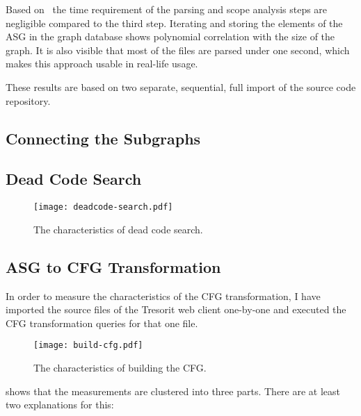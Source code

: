 Based on~ the time requirement of the parsing and scope analysis steps are negligible compared to the third step. Iterating and storing the elements of the ASG in the graph database shows polynomial correlation with the size of the graph. It is also visible that most of the files are parsed under one second, which makes this approach usable in real-life usage.

These results are based on two separate, sequential, full import of the source code repository.

\subsection{Connecting the Subgraphs}

\subsection{Dead Code Search}

\begin{figure}[!htb]
  \centering
  \texttt{[image: deadcode-search.pdf]}
  \caption{The characteristics of dead code search.}
  \label{fig:deadcode-search}
\end{figure}

\subsection{ASG to CFG Transformation}
In order to measure the characteristics of the CFG transformation, I have imported the source files of the Tresorit web client one-by-one and executed the CFG transformation queries for that one file.

\begin{figure}[!htb]
  \centering
  \texttt{[image: build-cfg.pdf]}
  \caption{The characteristics of building the CFG.}
  \label{fig:build-cfg}
\end{figure}

 shows that the measurements are clustered into three parts. There are at least two explanations for this:

